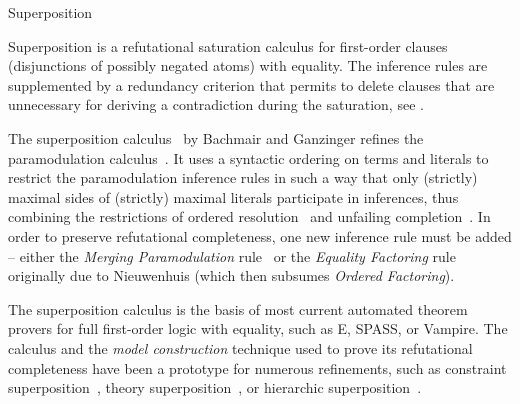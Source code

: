 \begin{entry}{Superposition}
\begin{calculus}
% 
\end{calculus}


\begin{clarifications}
Superposition is a refutational saturation calculus for
first-order clauses (disjunctions of possibly negated atoms)
with equality.
The inference rules are supplemented by a redundancy criterion
that permits to delete clauses that are unnecessary for
deriving a contradiction during the saturation, see .
\end{clarifications}

\begin{history}
The superposition
calculus~\cite{BachmairGanzinger1990CTRS,BachmairGanzinger1994JLC}
by Bachmair and Ganzinger
refines the paramodulation calculus~.
It uses a syntactic ordering on terms and
literals to restrict the paramodulation inference rules
in such a way that only (strictly) maximal sides of (strictly) maximal
literals participate in inferences,
thus combining the restrictions of
ordered resolution~ and
unfailing completion~.
In order to preserve refutational completeness, one new
inference rule must be added -- either
the \textit{Merging Paramodulation} rule~\cite{BachmairGanzinger1990CTRS}
or the \textit{Equality Factoring} rule originally due to Nieuwenhuis
(which then subsumes \textit{Ordered Factoring}).

The superposition calculus is the basis of most current automated
theorem provers for full first-order logic with equality,
such as E, SPASS, or Vampire.
The calculus and the \emph{model construction} technique used
to prove its refutational completeness have been a prototype
for numerous refinements, such as
constraint superposition~,
theory superposition~,
or hierarchic superposition~.

\end{history}


\end{entry}
